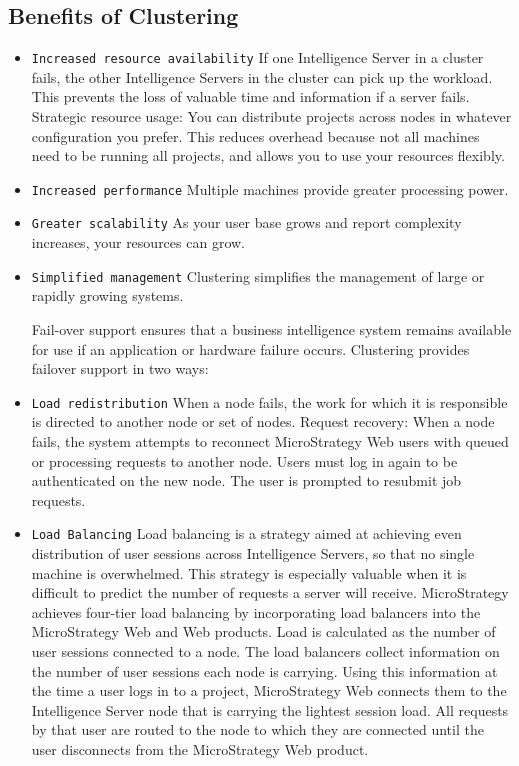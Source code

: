 \documentclass[12pt]{article}
\begin{document}
\subsection{Benefits of Clustering}
\begin{itemize}
\item \texttt{Increased resource availability} If one Intelligence Server in a cluster fails, the other Intelligence Servers in the cluster can pick up the workload. This prevents the loss of valuable time and information if a server fails.
Strategic resource usage: You can distribute projects across nodes in whatever configuration you prefer. This reduces overhead because not all machines need to be running all projects, and allows you to use your resources flexibly.

\item \texttt{Increased performance} Multiple machines provide greater processing power.
\item \texttt{Greater scalability} As your user base grows and report complexity increases, your resources can grow.
\item \texttt{Simplified management} Clustering simplifies the management of large or rapidly growing systems.

Fail-over support ensures that a business intelligence system remains available for use if an application or hardware failure occurs. Clustering provides failover support in two ways:
\item
\texttt{Load redistribution} When a node fails, the work for which it is responsible is directed to another node or set of nodes.
Request recovery: When a node fails, the system attempts to reconnect MicroStrategy Web users with queued or processing requests to another node. Users must log in again to be authenticated on the new node. The user is prompted to resubmit job requests.

\item \texttt{Load Balancing}
Load balancing is a strategy aimed at achieving even distribution of user sessions across Intelligence Servers, so that no single machine is overwhelmed. This strategy is especially valuable when it is difficult to predict the number of requests a server will receive. MicroStrategy achieves four-tier load balancing by incorporating load balancers into the MicroStrategy Web and Web products. Load is calculated as the number of user sessions connected to a node. The load balancers collect information on the number of user sessions each node is carrying. Using this information at the time a user logs in to a project, MicroStrategy Web connects them to the Intelligence Server node that is carrying the lightest session load. All requests by that user are routed to the node to which they are connected until the user disconnects from the MicroStrategy Web product.


\end{itemize}
\end{document}
